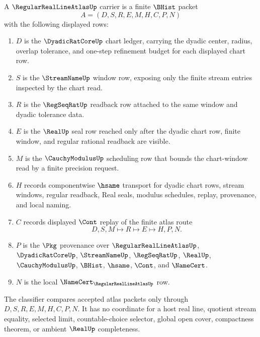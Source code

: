 \begin{definition}
\label{def:regular-real-line-atlas-carrier}
A $\RegularRealLineAtlasUp$ carrier is a finite $\BHist$ packet
$$
A=(D,S,R,E,M,H,C,P,N)
$$
with the following displayed rows:
\begin{enumerate}
\item $D$ is the $\DyadicRatCoreUp$ chart ledger, carrying the dyadic center, radius, overlap tolerance, and one-step refinement budget for each displayed chart row.
\item $S$ is the $\StreamNameUp$ window row, exposing only the finite stream entries inspected by the chart read.
\item $R$ is the $\RegSeqRatUp$ readback row attached to the same window and dyadic tolerance data.
\item $E$ is the $\RealUp$ seal row reached only after the dyadic chart row, finite window, and regular rational readback are visible.
\item $M$ is the $\CauchyModulusUp$ scheduling row that bounds the chart-window read by a finite precision request.
\item $H$ records componentwise $\hsame$ transport for dyadic chart rows, stream windows, regular readback, Real seals, modulus schedules, replay, provenance, and local naming.
\item $C$ records displayed $\Cont$ replay of the finite atlas route
$$
D,S,M \longmapsto R \longmapsto E \longmapsto H,P,N .
$$
\item $P$ is the $\Pkg$ provenance over $\RegularRealLineAtlasUp$, $\DyadicRatCoreUp$, $\StreamNameUp$, $\RegSeqRatUp$, $\RealUp$, $\CauchyModulusUp$, $\BHist$, $\hsame$, $\Cont$, and $\NameCert$.
\item $N$ is the local $\NameCert_{\RegularRealLineAtlasUp}$ row.
\end{enumerate}
The classifier compares accepted atlas packets only through $D,S,R,E,M,H,C,P,N$. It has no coordinate for a host real line, quotient stream equality, selected limit, countable-choice selector, global open cover, compactness theorem, or ambient $\RealUp$ completeness.
\end{definition}

